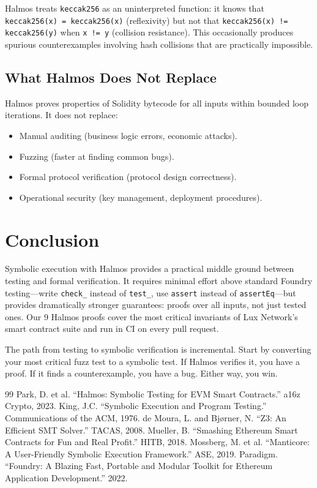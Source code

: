 \documentclass[11pt,a4paper]{article}
\begin{document}
Halmos treats \texttt{keccak256} as an uninterpreted function: it knows that
\texttt{keccak256(x) = keccak256(x)} (reflexivity) but not that
\texttt{keccak256(x) != keccak256(y)} when \texttt{x != y} (collision resistance).
This occasionally produces spurious counterexamples involving hash collisions that
are practically impossible.

\subsection{What Halmos Does Not Replace}

Halmos proves properties of Solidity bytecode for all inputs within bounded loop
iterations. It does not replace:
\begin{itemize}[nosep]
  \item Manual auditing (business logic errors, economic attacks).
  \item Fuzzing (faster at finding common bugs).
  \item Formal protocol verification (protocol design correctness).
  \item Operational security (key management, deployment procedures).
\end{itemize}

\section{Conclusion}

Symbolic execution with Halmos provides a practical middle ground between testing and
formal verification. It requires minimal effort above standard Foundry testing---write
\texttt{check\_} instead of \texttt{test\_}, use \texttt{assert} instead of
\texttt{assertEq}---but provides dramatically stronger guarantees: proofs over all
inputs, not just tested ones. Our 9 Halmos proofs cover the most critical invariants of
Lux Network's smart contract suite and run in CI on every pull request.

The path from testing to symbolic verification is incremental. Start by converting your
most critical fuzz test to a symbolic test. If Halmos verifies it, you have a proof.
If it finds a counterexample, you have a bug. Either way, you win.

\begin{thebibliography}{99}
 Park, D. et al. ``Halmos: Symbolic Testing for EVM Smart Contracts.'' a16z Crypto, 2023.
 King, J.C. ``Symbolic Execution and Program Testing.'' Communications of the ACM, 1976.
 de Moura, L. and Bj{\o}rner, N. ``Z3: An Efficient SMT Solver.'' TACAS, 2008.
 Mueller, B. ``Smashing Ethereum Smart Contracts for Fun and Real Profit.'' HITB, 2018.
 Mossberg, M. et al. ``Manticore: A User-Friendly Symbolic Execution Framework.'' ASE, 2019.
 Paradigm. ``Foundry: A Blazing Fast, Portable and Modular Toolkit for Ethereum Application Development.'' 2022.
\end{thebibliography}
\end{document}
